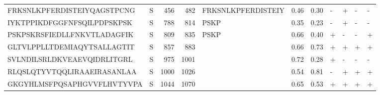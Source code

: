 \begin{tabular}{llrrlrrllll}
FRKSNLKPFERDISTEIYQAGSTPCNG &       S &    456 &   482 &  FRKSNLKPFERDISTEIY &            0.46 &             0.30 &      - &       + &      - &       - \\
IYKTPPIKDFGGFNFSQILPDPSKPSK &       S &    788 &   814 &                PSKP &            0.35 &             0.23 &      - &       + &      - &       - \\
PSKPSKRSFIEDLLFNKVTLADAGFIK &       S &    809 &   835 &                PSKP &            0.66 &             0.40 &      + &       - &      - &       + \\
GLTVLPPLLTDEMIAQYTSALLAGTIT &       S &    857 &   883 &                     &            0.66 &             0.73 &      + &       + &      + &       + \\
SVLNDILSRLDKVEAEVQIDRLITGRL &       S &    975 &  1001 &                     &            0.72 &             0.28 &      + &       - &      - &       - \\
RLQSLQTYVTQQLIRAAEIRASANLAA &       S &   1000 &  1026 &                     &            0.54 &             0.81 &      - &       + &      + &       + \\
GKGYHLMSFPQSAPHGVVFLHVTYVPA &       S &   1044 &  1070 &                     &            0.65 &             0.53 &      + &       + &      + &       + \\
\bottomrule
\end{tabular}
